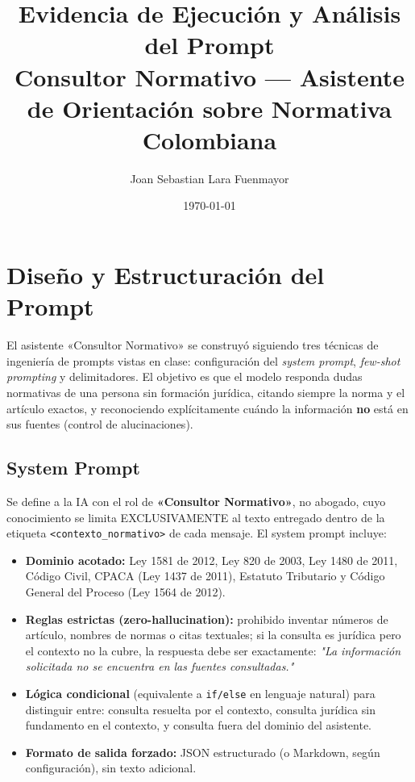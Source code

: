 \documentclass[11pt]{article}
\title{\textbf{Evidencia de Ejecución y Análisis del Prompt}\\
  \large Consultor Normativo — Asistente de Orientación sobre Normativa Colombiana}
\author{Joan Sebastian Lara Fuenmayor}
\date{\today}
\begin{document}
\maketitle

\section{Diseño y Estructuración del Prompt}

El asistente «Consultor Normativo» se construyó siguiendo tres técnicas de
ingeniería de prompts vistas en clase: configuración del \emph{system prompt},
\emph{few-shot prompting} y delimitadores. El objetivo es que el modelo
responda dudas normativas de una persona sin formación jurídica, citando
siempre la norma y el artículo exactos, y reconociendo explícitamente cuándo
la información \textbf{no} está en sus fuentes (control de alucinaciones).

\subsection{System Prompt}

Se define a la IA con el rol de \textbf{«Consultor Normativo»}, no abogado,
cuyo conocimiento se limita EXCLUSIVAMENTE al texto entregado dentro de la
etiqueta \texttt{<contexto\_normativo>} de cada mensaje. El system prompt
incluye:
\begin{itemize}
  \item \textbf{Dominio acotado:} Ley 1581 de 2012, Ley 820 de 2003,
    Ley 1480 de 2011, Código Civil, CPACA (Ley 1437 de 2011), Estatuto
    Tributario y Código General del Proceso (Ley 1564 de 2012).
  \item \textbf{Reglas estrictas (zero-hallucination):} prohibido inventar
    números de artículo, nombres de normas o citas textuales; si la consulta
    es jurídica pero el contexto no la cubre, la respuesta debe ser
    exactamente: \emph{"La información solicitada no se encuentra en las
    fuentes consultadas."}
  \item \textbf{Lógica condicional} (equivalente a \texttt{if/else} en
    lenguaje natural) para distinguir entre: consulta resuelta por el
    contexto, consulta jurídica sin fundamento en el contexto, y consulta
    fuera del dominio del asistente.
  \item \textbf{Formato de salida forzado:} JSON estructurado (o Markdown,
    según configuración), sin texto adicional.
\end{itemize}
\end{document}
